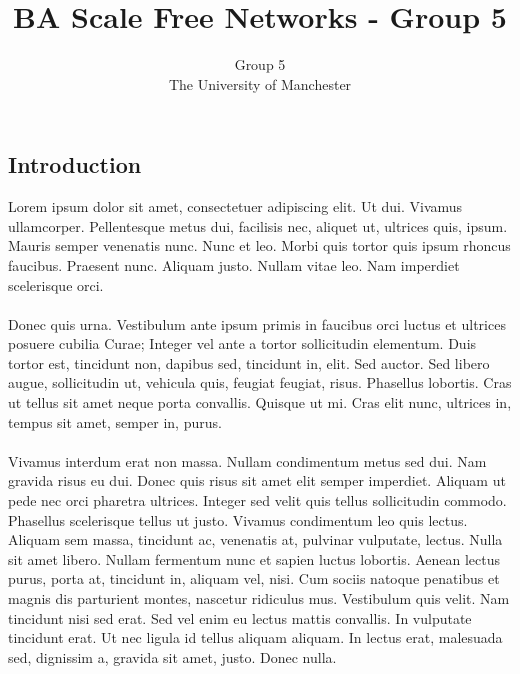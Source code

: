 \documentclass[a0,final]{a0poster}
\title{BA Scale Free Networks - Group 5}
\author{Group 5\\
The University of Manchester}
\begin{document}
\hspace{-3cm}								%
\colorbox{boxcol}{							%
\begin{minipage}{1189mm}					%
\maketitle
\end{minipage}}
\vspace{1cm}

\begin{multicols}{3}							%
\raggedcolumns							%

\section{Introduction}
Lorem ipsum dolor sit amet, consectetuer adipiscing elit. Ut dui. Vivamus ullamcorper. Pellentesque metus dui, facilisis nec, aliquet ut, ultrices quis, ipsum. Mauris semper venenatis nunc. Nunc et leo. Morbi quis tortor quis ipsum rhoncus faucibus. Praesent nunc. Aliquam justo. Nullam vitae leo. Nam imperdiet scelerisque orci.\\
\\
Donec quis urna. Vestibulum ante ipsum primis in faucibus orci luctus et ultrices posuere cubilia Curae; Integer vel ante a tortor sollicitudin elementum. Duis tortor est, tincidunt non, dapibus sed, tincidunt in, elit. Sed auctor. Sed libero augue, sollicitudin ut, vehicula quis, feugiat feugiat, risus. Phasellus lobortis. Cras ut tellus sit amet neque porta convallis. Quisque ut mi. Cras elit nunc, ultrices in, tempus sit amet, semper in, purus.\\
\\
Vivamus interdum erat non massa. Nullam condimentum metus sed dui. Nam gravida risus eu dui. Donec quis risus sit amet elit semper imperdiet. Aliquam ut pede nec orci pharetra ultrices. Integer sed velit quis tellus sollicitudin commodo. Phasellus scelerisque tellus ut justo. Vivamus condimentum leo quis lectus. Aliquam sem massa, tincidunt ac, venenatis at, pulvinar vulputate, lectus. Nulla sit amet libero. Nullam fermentum nunc et sapien luctus lobortis. Aenean lectus purus, porta at, tincidunt in, aliquam vel, nisi. Cum sociis natoque penatibus et magnis dis parturient montes, nascetur ridiculus mus. Vestibulum quis velit. Nam tincidunt nisi sed erat. Sed vel enim eu lectus mattis convallis. In vulputate tincidunt erat. Ut nec ligula id tellus aliquam aliquam. In lectus erat, malesuada sed, dignissim a, gravida sit amet, justo. Donec nulla.



\end{multicols}
\end{document}
